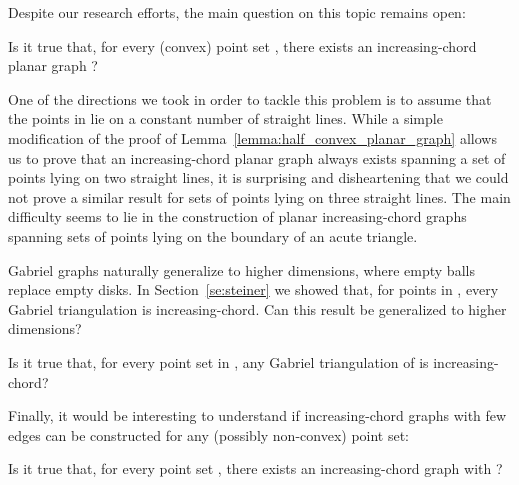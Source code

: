 \documentclass{llncs}
\begin{document}
Despite our research efforts, the main question on this topic remains open:

\begin{problem}
Is it true that, for every (convex) point set , there exists an increasing-chord planar graph ?
\end{problem}

One of the directions we took in order to tackle this problem is to assume that the points in  lie on a constant number of straight lines. While a simple modification of the proof of Lemma~\ref{lemma:half_convex_planar_graph} allows us to prove that an increasing-chord planar graph always exists spanning a set of points lying on two straight lines, it is surprising and disheartening that we could not prove a similar result for sets of points lying on three straight lines. The main difficulty seems to lie in the construction of planar increasing-chord graphs spanning sets of points lying on the boundary of an acute triangle.

Gabriel graphs naturally generalize to higher dimensions, where empty balls replace empty disks. In Section~\ref{se:steiner} we showed that, for points in , every Gabriel triangulation is increasing-chord. Can this result be generalized to higher dimensions?

\begin{problem}
Is it true that, for every point set  in , any Gabriel triangulation of  is increasing-chord?\end{problem}

Finally, it would be interesting to understand if increasing-chord graphs with few edges can be constructed for any (possibly non-convex) point set:

\begin{problem}
Is it true that, for every point set , there exists an increasing-chord graph  with ?
\end{problem}



\end{document}

